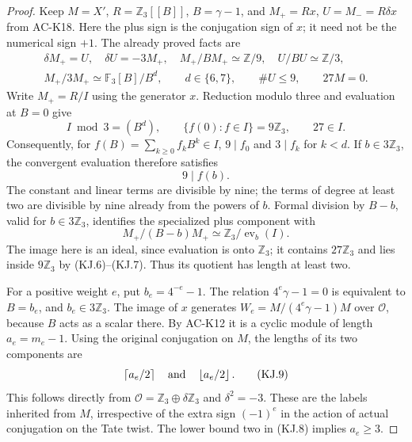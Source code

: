 \begin{proof}
Keep $M=X'$, $R=\mathbb Z_3[[B]]$, $B=\gamma-1$,
and $M_+=Rx$, $U=M_-=R\delta x$ from AC-K18.
Here the plus sign is the conjugation sign of $x$;
it need not be the numerical sign $+1$.
The already proved facts are
\[
 \begin{gathered}
 \delta M_+=U,\quad \delta U=-3M_+,\quad
 M_+/BM_+\simeq\mathbb Z/9,\quad U/BU\simeq\mathbb Z/3,\\
 M_+/3M_+\simeq\mathbb F_3[B]/B^d,
       \qquad d\in\{6,7\},\qquad \#U\leq9,\qquad27M=0.
 \end{gathered}                                      \tag{KJ.5}
\]
Write $M_+=R/I$ using the generator $x$.
Reduction modulo three and evaluation at $B=0$ give
\[
       I\bmod3=(B^d),\qquad
       \{f(0):f\in I\}=9\mathbb Z_3,
       \qquad27\in I.                               \tag{KJ.6}
\]
Consequently, for $f(B)=\sum_{k\geq0}f_kB^k\in I$,
$9\mid f_0$ and $3\mid f_k$ for $k<d$.
If $b\in3\mathbb Z_3$, the convergent evaluation therefore
satisfies
\[
                         9\mid f(b).                \tag{KJ.7}
\]
The constant and linear terms are divisible by nine;
the terms of degree at least two are divisible by nine
already from the powers of $b$.
Formal division by $B-b$, valid for $b\in3\mathbb Z_3$,
identifies the specialized plus component with
\[
 M_+/(B-b)M_+
       \simeq\mathbb Z_3/\operatorname{ev}_b(I).
                                                               \tag{KJ.8}
\]
The image here is an ideal, since evaluation is onto
$\mathbb Z_3$; it contains $27\mathbb Z_3$ and lies
inside $9\mathbb Z_3$ by (KJ.6)--(KJ.7).
Thus its quotient has length at least two.

For a positive weight $e$, put $b_e=4^{-e}-1$.
The relation $4^e\gamma-1=0$ is equivalent to $B=b_e$,
and $b_e\in3\mathbb Z_3$.
The image of $x$ generates $W_e=M/(4^e\gamma-1)M$
over $\mathcal O$, because $B$ acts as a scalar there.
By AC-K12 it is a cyclic module of length $a_e=m_e-1$.
Using the original conjugation on $M$, the lengths of
its two components are
\[
       \left\lceil a_e/2\right\rceil
       \quad\hbox{and}\quad
       \left\lfloor a_e/2\right\rfloor.             \tag{KJ.9}
\]
This follows directly from
$\mathcal O=\mathbb Z_3\oplus\delta\mathbb Z_3$
and $\delta^2=-3$.
These are the labels inherited from $M$, irrespective
of the extra sign $(-1)^e$ in the action of actual
conjugation on the Tate twist.
The lower bound two in (KJ.8) implies $a_e\geq3$.


\end{proof}
